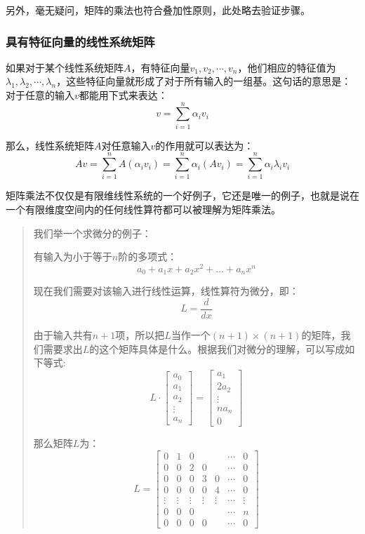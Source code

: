 另外，毫无疑问，矩阵的乘法也符合叠加性原则，此处略去验证步骤。
\subsubsection{具有特征向量的线性系统矩阵}
如果对于某个线性系统矩阵$A$，有特征向量$v_1,v_2,\cdots,v_n$，他们相应的特征值为$\lambda_1,\lambda_2,\cdots,\lambda_n$，这些特征向量就形成了对于所有输入的一组基。这句话的意思是：对于任意的输入$v$都能用下式来表达：
\begin{equation}
	v = \sum_{i=1}^{n}\alpha_iv_i
\end{equation}

那么，线性系统矩阵$A$对任意输入$v$的作用就可以表达为：
\begin{equation}
	Av = \sum_{i=1}^{n}A(\alpha_iv_i) = \sum_{i=1}^n\alpha_i(Av_i) = \sum_{i=1}^n \alpha_i\lambda_iv_i
\end{equation}

矩阵乘法不仅仅是有限维线性系统的一个好例子，它还是唯一的例子，也就是说在一个有限维度空间内的任何线性算符都可以被理解为矩阵乘法。

\begin{quote}
	我们举一个求微分的例子：

	有输入为小于等于$n$阶的多项式：
	$$
		a_0+a_1x+a_2x^2+…+a_nx^n
	$$

	现在我们需要对该输入进行线性运算，线性算符为微分，即：
	$$
		L = \frac{d}{dx}
	$$

	由于输入共有$n+1$项，所以把$L$当作一个$(n+1)\times (n+1)$的矩阵，我们需要求出$L$的这个矩阵具体是什么。根据我们对微分的理解，可以写成如下等式:
	$$
		L\cdot \begin{bmatrix} a_0\\  a_1\\  a_2\\  \vdots\\  a_n \end{bmatrix} = \begin{bmatrix} a_1\\  2a_2\\  \vdots\\  na_n\\  0 \end{bmatrix}
	$$

	那么矩阵$L$为：
	$$
		L=\begin{bmatrix} 0 &1  &0  &  &  &\cdots   &0 \\  0 &0  &2  &0  &  &\cdots   &0 \\  0 &0  &0  &3  &0  &\cdots   &0 \\  0 &0  &0  &0  &4  &\cdots   &0 \\  \vdots &\vdots  &\vdots  &\vdots  &\vdots  &\cdots   &\vdots \\  0 &0  &0  &  &  &\cdots   &n \\  0 &0  &0  &0  &  &\cdots   &0  \end{bmatrix}
	$$
\end{quote}
